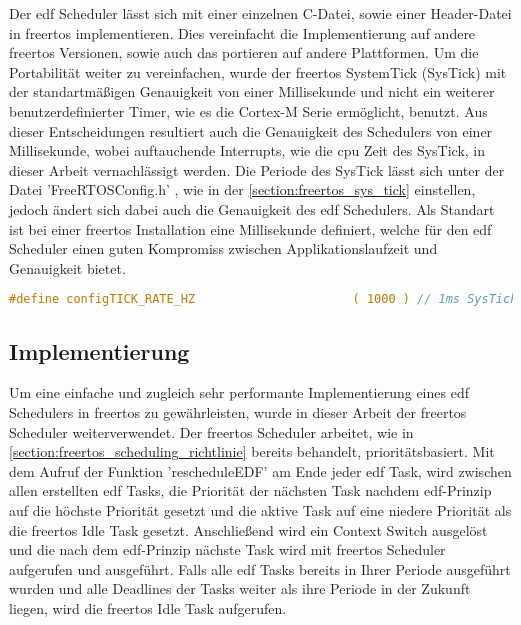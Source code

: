 \documentclass[../EDF Master Thesis.tex]{subfiles}
\begin{document}
Der \ac{edf} Scheduler lässt sich mit einer einzelnen C-Datei, sowie einer Header-Datei in \ac{freertos} implementieren.
Dies vereinfacht die Implementierung auf andere \ac{freertos} Versionen, sowie auch das portieren auf andere Plattformen.
Um die Portabilität weiter zu vereinfachen, wurde der \ac{freertos} SystemTick (SysTick) mit der standartmäßigen Genauigkeit von einer Millisekunde und nicht ein weiterer benutzerdefinierter Timer, wie es die Cortex-M Serie ermöglicht, benutzt.
Aus dieser Entscheidungen resultiert auch die Genauigkeit des Schedulers von einer Millisekunde, wobei auftauchende Interrupts, wie die \ac{cpu} Zeit des SysTick, in dieser Arbeit vernachlässigt werden.
Die Periode des SysTick lässt sich unter der Datei 'FreeRTOSConfig.h' , wie in der \autoref{section:freertos_sys_tick} einstellen, jedoch ändert sich dabei auch die Genauigkeit des \ac{edf} Schedulers.
Als Standart ist bei einer \ac{freertos} Installation eine Millisekunde definiert, welche für den \ac{edf} Scheduler einen guten Kompromiss zwischen Applikationslaufzeit und Genauigkeit bietet.

\begin{lstlisting}[language=C, caption=FreeRTOS Idle Task Hook, label=code:freertos_idle_task_hook]
    #define configTICK_RATE_HZ						( 1000 ) // 1ms SysTick
\end{lstlisting}

\subsection{Implementierung} \label{section:implementierung}
    Um eine einfache und zugleich sehr performante Implementierung eines \ac{edf} Schedulers in \ac{freertos} zu gewährleisten, wurde in dieser Arbeit der \ac{freertos} Scheduler weiterverwendet.
    Der \ac{freertos} Scheduler arbeitet, wie in \autoref{section:freertos_scheduling_richtlinie} bereits behandelt, prioritätsbasiert.
    Mit dem Aufruf der Funktion 'rescheduleEDF' am Ende jeder \ac{edf} Task, wird zwischen allen erstellten \ac{edf} Tasks, die Priorität der nächsten Task nachdem \ac{edf}-Prinzip auf die höchste Priorität gesetzt und die aktive Task auf eine niedere Priorität als die \ac{freertos} Idle Task gesetzt.
    Anschließend wird ein Context Switch ausgelöst und die nach dem \ac{edf}-Prinzip nächste Task wird mit \ac{freertos} Scheduler aufgerufen und ausgeführt.
    Falls alle \ac{edf} Tasks bereits in Ihrer Periode ausgeführt wurden und alle Deadlines der Tasks weiter als ihre Periode in der Zukunft liegen, wird die \ac{freertos} Idle Task aufgerufen.
\end{document}
